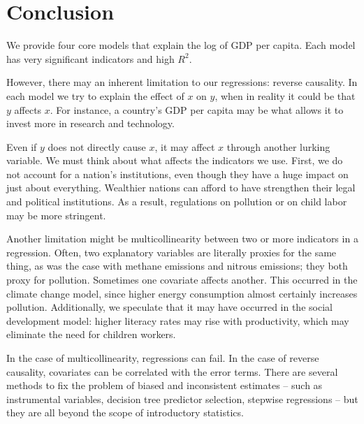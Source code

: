 \documentclass[11pt]{article}
\begin{document}
\section{Conclusion}
\label{sec:conclusion}
We provide four core models that explain the log of GDP per capita. Each model has very significant indicators and high $R^2$.

However, there may an inherent limitation to our regressions: reverse causality.
In each model we try to explain the effect of $x$ on $y$, when in reality it could be that $y$ affects $x$. For instance, a country's GDP per capita may be what allows it to invest more in research and technology.

Even if $y$ does not directly cause $x$, it may affect $x$ through another lurking variable. We must think about what affects the indicators we use. First, we do not account for a nation's institutions, even though they have a huge impact on just about everything. Wealthier nations can afford to have strengthen their legal and political institutions. As a result, regulations on pollution or on child labor may be more stringent.

Another limitation might be multicollinearity between two or more indicators in a regression. Often, two explanatory variables are literally proxies for the same thing, as was the case with methane emissions and nitrous emissions; they both proxy for pollution. Sometimes one covariate affects another. This occurred in the climate change model, since higher energy consumption almost certainly increases pollution. Additionally, we speculate that it may have occurred in the social development model: higher literacy rates may rise with productivity, which may eliminate the need for children workers.

In the case of multicollinearity, regressions can fail. In the case of reverse causality, covariates can be correlated with the error terms. There are several methods to fix the problem of biased and inconsistent estimates -- such as instrumental variables, decision tree predictor selection, stepwise regressions -- but they are all beyond the scope of introductory statistics.
\end{document}

